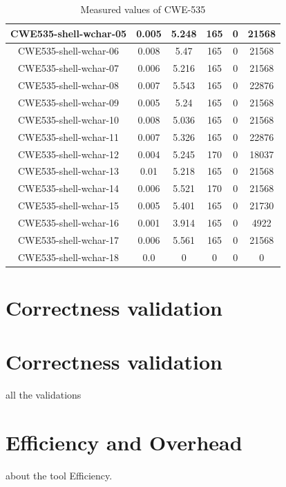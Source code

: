 \begin{table}[h!]
\begin{tabular}{||c |c |c |c |c| c||}
 \hline
 CWE535-shell-wchar-05 & 0.005 &5.248 & 165&0& 21568\\ 
 \hline
 CWE535-shell-wchar-06 & 0.008 & 5.47 & 165&0& 21568\\ 
 \hline
 CWE535-shell-wchar-07 & 0.006& 5.216 & 165&0& 21568\\ 
 \hline
 CWE535-shell-wchar-08 & 0.007 & 5.543 & 165&0& 22876\\ 
 \hline
 CWE535-shell-wchar-09 & 0.005 & 5.24 & 165&0& 21568\\ 
 \hline
 CWE535-shell-wchar-10 & 0.008 & 5.036 & 165&0&21568 \\ 
 \hline
 CWE535-shell-wchar-11 & 0.007 & 5.326 & 165&0&22876 \\ 
 \hline
 CWE535-shell-wchar-12 & 0.004 & 5.245 &170&0& 18037\\ 
 \hline
 CWE535-shell-wchar-13 & 0.01 &5.218 & 165&0& 21568\\ 
 \hline
 CWE535-shell-wchar-14 & 0.006 & 5.521 &170&0& 21568\\ 
 \hline
 CWE535-shell-wchar-15 & 0.005 & 5.401 & 165&0&21730\\ 
 \hline
  CWE535-shell-wchar-16 & 0.001 & 3.914 & 165&0& 4922\\ 
 \hline
  CWE535-shell-wchar-17 & 0.006 & 5.561 & 165&0& 21568\\ 
 \hline
  CWE535-shell-wchar-18 & 0.0 & 0 & 0&0& 0\\
 \hline
 \hline
\end{tabular}
\caption{Measured values of CWE-535}
\label{table:times}
\end{table}
\section{Correctness validation}


\section{Correctness validation}
all the validations 
 
\section{Efficiency and Overhead}
about the tool Efficiency.

